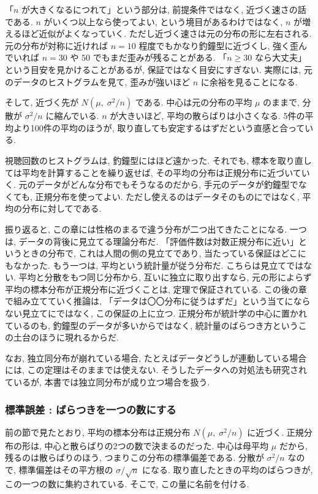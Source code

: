     「$n$ が大きくなるにつれて」という部分は, 前提条件ではなく, 近づく速さの話である.
    $n$ がいくつ以上なら使ってよい, という境目があるわけではなく, $n$ が増えるほど近似がよくなっていく.
    ただし近づく速さは元の分布の形に左右される.
    元の分布が対称に近ければ $n = 10$ 程度でもかなり釣鐘型に近づくし, 強く歪んでいれば $n = 30$ や $50$ でもまだ歪みが残ることがある.
    「$n \geq 30$ なら大丈夫」という目安を見かけることがあるが, 保証ではなく目安にすぎない.
    実際には, 元のデータのヒストグラムを見て, 歪みが強いほど $n$ に余裕を見ることになる.

    そして, 近づく先が $N(\mu,\; \sigma^2/n)$ である.
    中心は元の分布の平均 $\mu$ のままで, 分散が $\sigma^2/n$ に縮んでいる.
    $n$ が大きいほど, 平均の散らばりは小さくなる.
    5件の平均より100件の平均のほうが, 取り直しても安定するはずだという直感と合っている.

    視聴回数のヒストグラムは, 釣鐘型にはほど遠かった.
    それでも, 標本を取り直しては平均を計算することを繰り返せば, その平均の分布は正規分布に近づいていく.
    元のデータがどんな分布でもそうなるのだから, 手元のデータが釣鐘型でなくても, 正規分布を使ってよい. ただし使えるのはデータそのものにではなく, 平均の分布に対してである.

    振り返ると, この章には性格のまるで違う分布が二つ出てきたことになる.
    一つは, データの背後に見立てる理論分布だ.
    「評価件数は対数正規分布に近い」というときの分布で, これは人間の側の見立てであり, 当たっている保証はどこにもなかった.
    もう一つは, 平均という統計量が従う分布だ.
    こちらは見立てではない.
    平均と分散をもつ同じ分布から, 互いに独立に取り出すなら, 元の形によらず平均の標本分布が正規分布に近づくことは, 定理で保証されている.
    この後の章で組み立てていく推論は, 「データは〇〇分布に従うはずだ」という当てにならない見立てにではなく, この保証の上に立つ.
    正規分布が統計学の中心に置かれているのも, 釣鐘型のデータが多いからではなく, 統計量のばらつき方というこの土台のほうに現れるからだ.

    なお, 独立同分布が崩れている場合, たとえばデータどうしが連動している場合には, この定理はそのままでは使えない.
    そうしたデータへの対処法も研究されているが, 本書では独立同分布が成り立つ場合を扱う.

    \subsubsection*{標準誤差 : ばらつきを一つの数にする}

    前の節で見たとおり, 平均の標本分布は正規分布 $N(\mu,\; \sigma^2/n)$ に近づく.
    正規分布の形は, 中心と散らばりの2つの数で決まるのだった.
    中心は母平均 $\mu$ だから, 残るのは散らばりのほう, つまりこの分布の標準偏差である.
    分散が $\sigma^2/n$ なので, 標準偏差はその平方根の $\sigma/\sqrt{n}$ になる.
    取り直したときの平均のばらつきが, この一つの数に集約されている.
    そこで, この量に名前を付ける.

